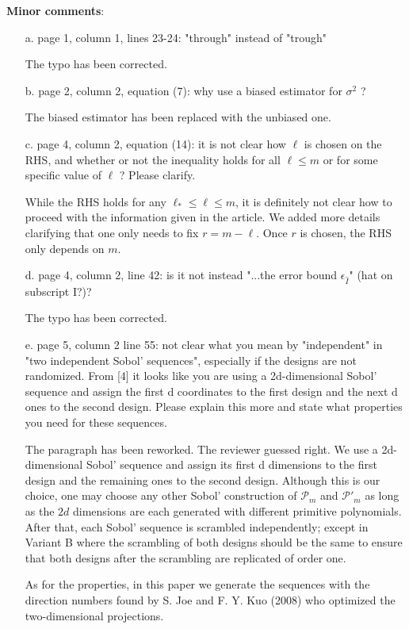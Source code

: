 \documentclass[10pt,a4paper]{article}
\newcommand{\answer}[1]{{\color{blue} #1 }}
\begin{document}
\textbf{Minor comments}:
\begin{itemize}
\item[a.] page 1, column 1, lines 23-24: "through" instead of "trough"

{\color{blue} The typo has been corrected.}
\item[b.] page 2, column 2, equation (7): why use a biased estimator for $\sigma^2$ ?

{\color{blue} The biased estimator has been replaced with the unbiased one.}
\item[c.] page 4, column 2, equation (14): it is not clear how $\ell$ is chosen on the RHS, and whether or not the inequality holds for all $\ell \leq m$ or for some specific value of $\ell$ ? Please clarify.

\answer{While the RHS holds for any $\ell_*\leq\ell\leq m$, it is definitely not clear how to proceed with the information given in the article. We added more details clarifying that one only needs to fix $r=m-\ell$. Once $r$ is chosen, the RHS only depends on $m$.}

\item[d.] page 4, column 2, line 42: is it not instead "...the error bound $\epsilon_{\hat{I}}$" (hat on subscript I?)?

{\color{blue} The typo has been corrected.}
\item[e.] page 5, column 2 line 55: not clear what you mean by "independent" in "two independent Sobol' sequences", especially if the designs are not randomized. From [4] it looks like you are using a 2d-dimensional Sobol' sequence and assign the first d coordinates to the first design and the next d ones to the second design. Please explain this more and state what properties you need for these sequences.

{\color{blue} The paragraph has been reworked. The reviewer guessed right. We use a 2d-dimensional Sobol' sequence and assign its first d dimensions to the first design and the remaining ones to the second design. Although this is our choice, one may choose any other Sobol' construction of $\mathcal{P}_{m}$ and $\mathcal{P}'_{m}$ as long as the $2d$ dimensions are each generated with different primitive polynomials. After that, each Sobol' sequence is scrambled independently; except in Variant B where the scrambling of both designs should be the same to ensure that both designs after the scrambling are replicated of order one.

As for the properties, in this paper we generate the sequences with the direction numbers found by S. Joe and F. Y. Kuo (2008) who optimized the two-dimensional projections.}


\end{itemize}
\end{document}
